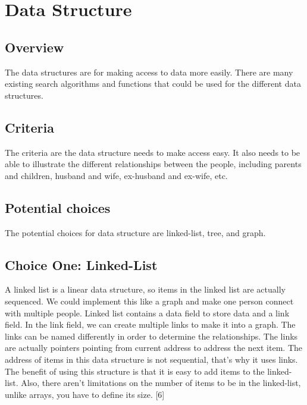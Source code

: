 \documentclass[onecolumn, draftclsnofoot, 10pt, compsoc]{IEEEtran}
\begin{document}
\section{Data Structure}
\subsection{Overview}
\begin{singlespace}
The data structures are for making access to data more easily. There are many existing search algorithms and functions that could be used for the different data structures. 
\end{singlespace}

\subsection{Criteria}
\begin{singlespace}
The criteria are the data structure needs to make access easy. It also needs to be able to illustrate the different relationships between the people, including parents and children, husband and wife, ex-husband and ex-wife, etc. 
\end{singlespace}

\subsection{Potential choices}
\begin{singlespace}
The potential choices for data structure are linked-list, tree, and graph.  
\end{singlespace}


\subsection{Choice One: Linked-List}
\begin{singlespace}
A linked list is a linear data structure, so items in the linked list are actually sequenced. We could implement this like a graph and make one person connect with multiple people. Linked list contains a data field to store data and a link field. In the link field, we can create multiple links to make it into a graph. The links can be named differently in order to determine the relationships. The links are actually pointers pointing from current address to address the next item. The address of items in this data structure is not sequential, that's why it uses links. The benefit of using this structure is that it is easy to add items to the linked-list. Also, there aren't limitations on the number of items to be in the linked-list, unlike arrays, you have to define its size. [6]
\end{singlespace}
\end{document}

